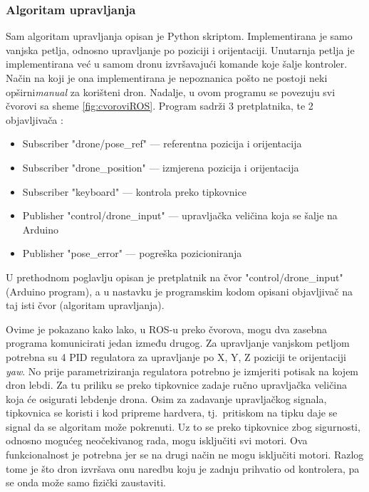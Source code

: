 \documentclass[times, utf8, diplomski]{fer}
\begin{document}
\subsubsection{Algoritam upravljanja}
Sam algoritam upravljanja opisan je Python skriptom. Implementirana je samo vanjska petlja, odnosno upravljanje po poziciji i orijentaciji. Unutarnja petlja je implementirana već u samom dronu izvršavajući komande koje šalje kontroler. Način na koji je ona implementirana je nepoznanica pošto ne postoji neki opširni\emph{manual} za korišteni dron. Nadalje, u ovom programu se povezuju svi čvorovi sa sheme \ref{fig:cvoroviROS}. Program sadrži 3 pretplatnika, te 2 objavljivača :
\begin{itemize}
\item Subscriber "drone/pose\_ref" --- referentna pozicija i orijentacija
\item Subscriber "drone\_position" --- izmjerena pozicija i orijentacija
\item Subscriber "keyboard" --- kontrola preko tipkovnice
\item Publisher "control/drone\_input" --- upravljačka veličina koja se šalje na Arduino
\item Publisher "pose\_error" --- pogreška pozicioniranja
\end{itemize}
U prethodnom poglavlju opisan je pretplatnik na čvor "control/drone\_input" (Arduino program), a u nastavku je programskim kodom opisani objavljivač na taj isti čvor (algoritam upravljanja). 

Ovime je pokazano kako lako, u ROS-u preko čvorova, mogu dva zasebna programa komunicirati jedan između drugog.
Za upravljanje vanjskom petljom potrebna su 4 PID regulatora za upravljanje po X, Y, Z poziciji te orijentaciji \emph{yaw}. No prije parametriziranja regulatora potrebno je izmjeriti potisak na kojem dron lebdi. Za tu priliku se preko tipkovnice zadaje ručno upravljačka veličina koja će osigurati lebdenje drona. Osim za zadavanje upravljačkog signala, tipkovnica se koristi i kod pripreme hardvera, tj.~pritiskom na tipku daje se signal da se algoritam može pokrenuti. Uz to se preko tipkovnice zbog sigurnosti, odnosno mogućeg neočekivanog rada, mogu isključiti svi motori. Ova funkcionalnost je potrebna jer se na drugi način ne mogu isključiti motori. Razlog tome je što dron izvršava onu naredbu koju je zadnju prihvatio od kontrolera, pa se onda može samo fizički zaustaviti. 

\end{document}
